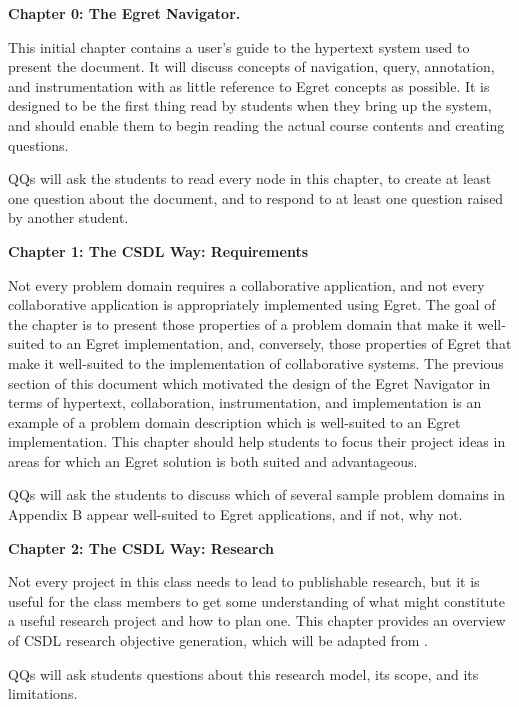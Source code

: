 \begin{itemizenoindent}

\item {\bf Chapter 0: The Egret Navigator.} 

This initial chapter contains a user's guide to the hypertext system used
to present the document.  It will discuss concepts of navigation, query,
annotation, and instrumentation with as little reference to Egret concepts
as possible.  It is designed to be the first thing read by students when
they bring up the system, and should enable them to begin reading the
actual course contents and creating questions.

QQs will ask the students to read every node in this chapter, to create
at least one question about the document, and to respond to at least one
question raised by another student. 

\item {\bf Chapter 1: The CSDL Way: Requirements}

Not every problem domain requires a collaborative application, and not
every collaborative application is appropriately implemented using Egret.
The goal of the chapter is to present those properties of a problem domain
that make it well-suited to an Egret implementation, and, conversely, those
properties of Egret that make it well-suited to the implementation of
collaborative systems.  The previous section of this document which
motivated the design of the Egret Navigator in terms of hypertext,
collaboration, instrumentation, and implementation is an example of a
problem domain description which is well-suited to an Egret implementation.
This chapter should help students to focus their project ideas in areas for
which an Egret solution is both suited and advantageous.

QQs will ask the students to discuss which of several sample problem
domains in Appendix B appear well-suited to Egret applications, and if not,
why not.

\item {\bf Chapter 2: The CSDL Way: Research}

Not every project in this class needs to lead to publishable research, but
it is useful for the class members to get some understanding of what might
constitute a useful research project and how to plan one.  This chapter
provides an overview of CSDL research objective generation, which will be
adapted from \cite{csdl-ro-93-01}.

QQs will ask students questions about this research model, its scope, and
its limitations.


\end{itemizenoindent}
